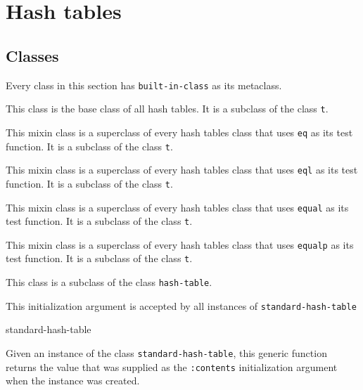 \chapter{Hash tables}

\section{Classes}

Every class in this section has \texttt{built-in-class} as its
metaclass.


This class is the base class of all hash tables.  It is a subclass of
the class \texttt{t}.


This mixin class is a superclass of every hash tables class that uses
\texttt{eq} as its test function.  It is a subclass of the class
\texttt{t}.


This mixin class is a superclass of every hash tables class that uses
\texttt{eql} as its test function.  It is a subclass of the class
\texttt{t}.


This mixin class is a superclass of every hash tables class that uses
\texttt{equal} as its test function.  It is a subclass of the class
\texttt{t}.


This mixin class is a superclass of every hash tables class that uses
\texttt{equalp} as its test function.  It is a subclass of the class
\texttt{t}.


This class is a subclass of the class \texttt{hash-table}.


This initialization argument is accepted by all instances of
\texttt{standard-hash-table}

 {standard-hash-table}

Given an instance of the class \texttt{standard-hash-table}, this
generic function returns the value that was supplied as the
\texttt{:contents} initialization argument when the instance was
created.
